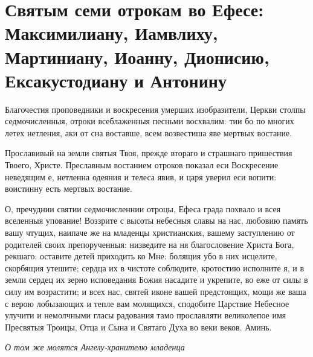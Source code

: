 \section{Святым семи отрокам во Ефесе: Максимилиану, Иамвлиху, Мартиниану, Иоанну, Дионисию, Ексакустодиану и Антонину}\begin{mymulticols}



Благочестия проповедники и воскресения умерших изобразители, Церкви столпы седмочисленныя, отроки всеблаженныя песньми восхвалим: тии бо по многих летех нетления, аки от сна воставше, всем возвестиша яве мертвых востание.




Прославивый на земли святыя Твоя, прежде втораго и страшнаго пришествия Твоего, Христе. Преславным востанием отроков показал еси Воскресение неведящим е, нетленна одеяния и телеса явив, и царя уверил еси вопити: воистинну есть мертвых востание.




О, пречуднии святии седмочисленнии отроцы, Ефеса града похвало и всея вселенныя упование! Воззрите с высоты небесныя славы на нас, любовию память вашу чтущих, наипаче же на младенцы христианския, вашему заступлению от родителей своих препорученныя: низведите на ня благословение Христа Бога, рекшаго: оставите детей приходить ко Мне: болящия убо в них исцелите, скорбящия утешите; сердца их в чистоте соблюдите, кротостию исполните я, и в земли сердец их зерно исповедания Божия насадите и укрепите, во еже от силы в силу им возрастити; и всех нас, святей иконе вашей предстоящих, мощи же ваша с верою лобызающих и тепле вам молящихся, сподобите Царствие Небесное улучити и немолчными гласы радования тамо прославляти великолепое имя Пресвятыя Троицы, Отца и Сына и Святаго Духа во веки веков. Аминь.

\itshape О том же молятся Ангелу-хранителю младенца\normalfont{}


\end{mymulticols}

\mychapterending





